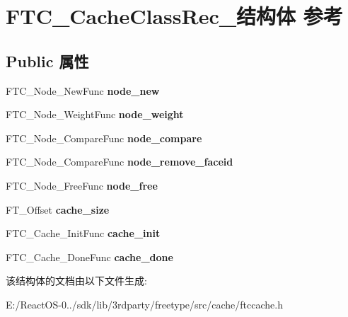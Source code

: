 \hypertarget{struct_f_t_c___cache_class_rec__}{}\section{F\+T\+C\+\_\+\+Cache\+Class\+Rec\+\_\+结构体 参考}
\label{struct_f_t_c___cache_class_rec__}
\subsection*{Public 属性}
\begin{DoxyCompactItemize}
\item 
\mbox{\label{struct_f_t_c___cache_class_rec___a7106a5782a661a9f5fde7cda87938c50}} 
F\+T\+C\+\_\+\+Node\+\_\+\+New\+Func {\bfseries node\+\_\+new}
\item 
\mbox{\label{struct_f_t_c___cache_class_rec___a482639d31459152ed234a39f8434f3cb}} 
F\+T\+C\+\_\+\+Node\+\_\+\+Weight\+Func {\bfseries node\+\_\+weight}
\item 
\mbox{\label{struct_f_t_c___cache_class_rec___af266a758d3500dbd373769fa8966c5de}} 
F\+T\+C\+\_\+\+Node\+\_\+\+Compare\+Func {\bfseries node\+\_\+compare}
\item 
\mbox{\label{struct_f_t_c___cache_class_rec___a36f5db312b9d685d740b7e74bf1404f6}} 
F\+T\+C\+\_\+\+Node\+\_\+\+Compare\+Func {\bfseries node\+\_\+remove\+\_\+faceid}
\item 
\mbox{\label{struct_f_t_c___cache_class_rec___a5149e5b11978da3077abce8304591a13}} 
F\+T\+C\+\_\+\+Node\+\_\+\+Free\+Func {\bfseries node\+\_\+free}
\item 
\mbox{\label{struct_f_t_c___cache_class_rec___a55796d1d7af59e136234142a4ed0bba6}} 
F\+T\+\_\+\+Offset {\bfseries cache\+\_\+size}
\item 
\mbox{\label{struct_f_t_c___cache_class_rec___a6d45eb4a85dc053c7a2d46c7e4237413}} 
F\+T\+C\+\_\+\+Cache\+\_\+\+Init\+Func {\bfseries cache\+\_\+init}
\item 
\mbox{\label{struct_f_t_c___cache_class_rec___a226669c4d3ce56b8640ec2fccfab5fb6}} 
F\+T\+C\+\_\+\+Cache\+\_\+\+Done\+Func {\bfseries cache\+\_\+done}
\end{DoxyCompactItemize}


该结构体的文档由以下文件生成\+:\begin{DoxyCompactItemize}
\item 
E\+:/\+React\+O\+S-\/0../sdk/lib/3rdparty/freetype/src/cache/ftccache.\+h\end{DoxyCompactItemize}
